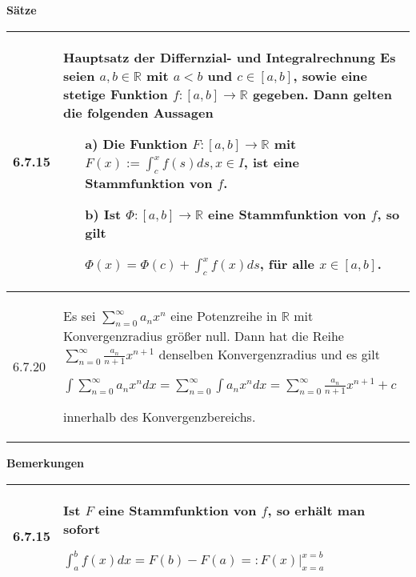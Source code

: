     \noindent 
    \textbf{Sätze}
    \begin{table}[H]
    \begin{tabularx}{\textwidth}{X m{16cm}}
        \toprule

        6.7.15& \textbf{Hauptsatz der Differnzial- und Integralrechnung} \hfill \break
                Es seien $a,b \in \mathbb{R}$ mit $a < b$ und $c \in [a,b]$, sowie eine stetige Funktion $f: [a,b] \rightarrow \mathbb{R}$
                gegeben. Dann gelten die folgenden Aussagen 
                \begin{itemize}[topsep=-0.5cm]
                    \item[a)] Die Funktion $F: [a,b] \rightarrow \mathbb{R}$ mit $F(x) := \int_c^xf(s) ds, x\in I$, ist eine Stammfunktion
                                von $f$.
                    \item[b)] Ist $\Phi : [a,b] \rightarrow \mathbb{R}$ eine Stammfunktion von $f$, so gilt \hfill \break
                                \centerline{$ \Phi(x) = \Phi(c) + \int_c^x f(x) ds$, für alle $x\in[a,b]$.}
                \end{itemize} \vspace{-0cm} \\
        \midrule
        6.7.20& Es sei $\sum^{\infty}_{n=0} a_n x^n$ eine Potenzreihe in $\mathbb{R}$ mit Konvergenzradius größer null. Dann hat die Reihe
                $\sum^{\infty}_{n=0} \frac{a_n}{n+1}x^{n+1}$ denselben Konvergenzradius und es gilt \hfill \break
                \centerline{$ \int \sum^{\infty}_{n=0} a_n x^n dx = \sum^{\infty}_{n=0} \int a_n x^n dx = \sum^{\infty}_{n=0} 
                \frac{a_n}{n+1}x^{n+1}+c $} innerhalb des Konvergenzbereichs. \\

        \bottomrule
    \end{tabularx}
    \end{table}

    \noindent
    \textbf{Bemerkungen}
    \begin{table}[H]
    \begin{tabularx}{\textwidth}{X m{16cm}}
        \toprule

        6.7.15& Ist $F$ eine Stammfunktion von $f$, so erhält man sofort \hfill \break
                \centerline{$ \int_a^bf(x) dx = F(b)-F(a) =: F(x) \vert^{x=b}_{x=a} $} \\

        \bottomrule
    \end{tabularx}
    \end{table}

